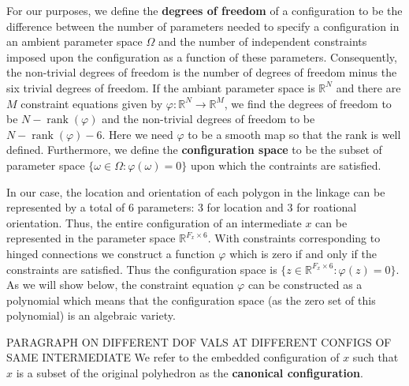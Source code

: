 

For our purposes, we define the \textbf{degrees of freedom} of a configuration to be the difference between the number of parameters needed to specify a configuration in an ambient parameter space $\Omega$ and the number of independent constraints imposed upon the configuration as a function of these parameters. Consequently, the non-trivial degrees of freedom is the number of degrees of freedom minus the six trivial degrees of freedom. If the ambiant parameter space is $\mathbb{R}^N$ and there are $M$ constraint equations given by $\varphi : \mathbb{R}^N \to \mathbb{R}^M$, we find the degrees of freedom to be $N - \operatorname{rank}(\varphi)$ and the non-trivial degrees of freedom to be $N - \operatorname{rank}(\varphi) - 6$. Here we need $\varphi$ to be a smooth map so that the rank is well defined. Furthermore, we define the \textbf{configuration space} to be the subset of parameter space $\{\omega \in \Omega : \varphi(\omega) = 0\}$ upon which the contraints are satisfied.

In our case, the location and orientation of each polygon in the linkage can be represented by a total of 6 parameters: 3 for location and 3 for roational orientation. Thus, the entire configuration of an intermediate $x$ can be represented in the parameter space $\mathbb{R}^{F_x\times6}$. With constraints corresponding to hinged connections we construct a function $\varphi$ which is zero if and only if the constraints are satisfied. Thus the configuration space is $\{z \in \mathbb{R}^{F_x\times6} : \varphi(z) =0\}$. As we will show below, the constraint equation $\varphi$ can be constructed as a polynomial which means that the configuration space (as the zero set of this polynomial) is an algebraic variety. 

 PARAGRAPH ON DIFFERENT DOF VALS AT DIFFERENT CONFIGS OF SAME INTERMEDIATE We refer to the embedded configuration of $x$ such that $x$ is a subset of the original polyhedron as the \textbf{canonical configuration}.

